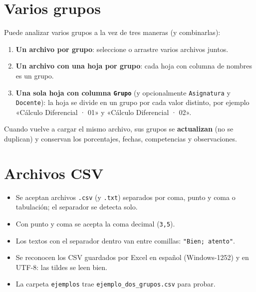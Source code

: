 \documentclass[11pt,letterpaper,oneside]{report}
\newcommand{\col}[1]{\texttt{\small #1}}
\begin{document}
\section{Varios grupos}\label{sec:variosgrupos}
Puede analizar varios grupos a la vez de tres maneras (y combinarlas):
\begin{enumerate}
  \item \textbf{Un archivo por grupo}: seleccione o arrastre varios archivos juntos.
  \item \textbf{Un archivo con una hoja por grupo}: cada hoja con columna de nombres es un grupo.
  \item \textbf{Una sola hoja con columna \col{Grupo}} (y opcionalmente \col{Asignatura} y \col{Docente}): la hoja se divide en un grupo por cada valor distinto, por ejemplo «Cálculo Diferencial · 01» y «Cálculo Diferencial · 02».
\end{enumerate}
Cuando vuelve a cargar el mismo archivo, sus grupos se \textbf{actualizan} (no se duplican) y conservan los porcentajes, fechas, competencias y observaciones.

\section{Archivos CSV}\label{sec:csv}
\begin{itemize}
  \item Se aceptan archivos \texttt{.csv} (y \texttt{.txt}) separados por coma, punto y coma o tabulación; el separador se detecta solo.
  \item Con punto y coma se acepta la coma decimal (\texttt{3,5}).
  \item Los textos con el separador dentro van entre comillas: \texttt{"Bien; atento"}.
  \item Se reconocen los CSV guardados por Excel en español (Windows-1252) y en UTF-8: las tildes se leen bien.
  \item La carpeta \texttt{ejemplos} trae \texttt{ejemplo\_dos\_grupos.csv} para probar.
\end{itemize}
\end{document}

